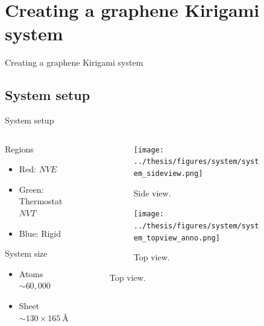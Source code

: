\documentclass[
	10pt, %
]{beamer}
\begin{document}
\section{Creating a graphene Kirigami system} %
\begin{frame}{Creating a graphene Kirigami system}
    \tableofcontents[currentsection]
\end{frame}


\subsection{System setup}
%
%
\begin{frame}{System setup}
	\begin{columns} 
		\hspace{5mm}
		\begin{column}{.4\textwidth}
			Regions
			\begin{itemize}
				\item Red: $NVE$
				\item Green: Thermostat $NVT$
				\item Blue: Rigid 
			\end{itemize}
			\vspace*{5mm}
			System size
			\begin{itemize}
				\item Atoms $\sim 60,000$
				\item Sheet $\sim 130 \times \SI{165}{\text{Å}}$
			\end{itemize}
		\end{column}
		\begin{column}{.5\textwidth}
			\begin{figure}[H]
				\raggedright
				\begin{subfigure}[b]{0.9\textwidth}
					\centering
					\texttt{[image: ../thesis/figures/system/system\_sideview.png]}
					\caption{Side view.}
				\end{subfigure}
				\begin{subfigure}[b]{0.9\textwidth}
					\centering
					\texttt{[image: ../thesis/figures/system/system\_topview\_anno.png]}
					\caption{Top view.}
				\end{subfigure}
			\end{figure}
		\end{column}%
	\end{columns}


	
\end{frame}
%
%
\end{document}
